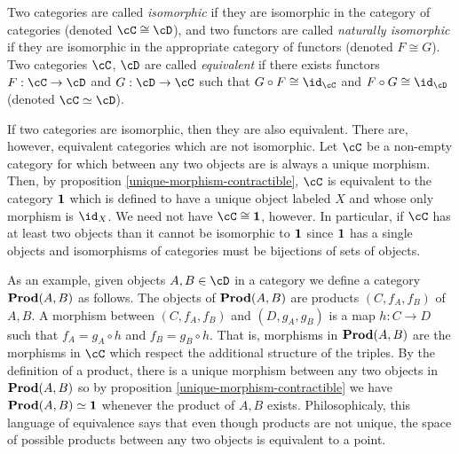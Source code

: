 \begin{defn} Two categories are called {\em isomorphic} if they are isomorphic in the category of categories (denoted $\cC\cong \cD$), and two functors are called {\em naturally isomorphic} if they are isomorphic in the appropriate category of functors (denoted $F\cong G$). Two categories $\cC$, $\cD$ are called {\em equivalent} if there exists functors $F:\cC\to \cD$ and $G:\cD\to \cC$ such that $G\circ F\cong\id_\cC$ and $F\circ G\cong \id_\cD$ (denoted $\cC\simeq \cD$).
\end{defn}

\begin{rem} If two categories are isomorphic, then they are also equivalent. There are, however, equivalent categories which are not isomorphic. Let $\cC$ be a non-empty category for which between any two objects are is always a unique morphism. Then, by proposition \ref{unique-morphism-contractible}, $\cC$ is equivalent to the category ${\bf 1}$ which is defined to have a unique object labeled $X$ and whose only morphism is $\id_X$. We need not have $\cC\cong {\bf 1}$, however. In particular, if $\cC$ has at least two objects than it cannot be isomorphic to $\bf 1$ since $\bf 1$ has a single objects and isomorphisms of categories must be bijections of sets of objects.

As an example, given objects $A,B\in \cD$ in a category we define a category ${\bf Prod}(A,B)$ as follows. The objects of ${\bf Prod}(A,B)$ are products $(C,f_A,f_B)$ of $A,B$. A morphism between $(C,f_A,f_B)$ and $(D,g_A,g_B)$ is a map $h:C\to D$ such that $f_A=g_A\circ h$ and $f_B=g_B\circ h$. That is, morphisms in ${\bf Prod}(A,B)$ are the morphisms in $\cC$ which respect the additional structure of the triples. By the definition of a product, there is a unique morphism between any two objects in ${\bf Prod}(A,B)$ so by proposition \ref{unique-morphism-contractible} we have ${\bf Prod}(A,B)\simeq {\bf 1}$ whenever the product of $A,B$ exists. Philosophicaly, this language of equivalence says that even though products are not unique, the space of possible products between any two objects is equivalent to a point.
\end{rem}



